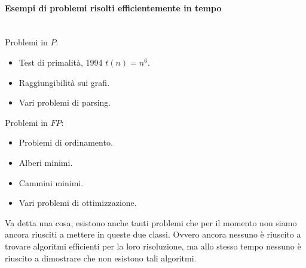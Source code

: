 \documentclass{article}
\begin{document}
\paragraph{Esempi di problemi risolti efficientemente in tempo}\mbox{}\\
Problemi in $P$:
\begin{itemize}
    \item Test di primalità, 1994 $t(n)=n^6$.
    \item Raggiungibilità sui grafi.
    \item Vari problemi di parsing.
\end{itemize}
Problemi in $FP$:
\begin{itemize}
    \item Problemi di ordinamento.
    \item Alberi minimi.
    \item Cammini minimi.
    \item Vari problemi di ottimizzazione.
\end{itemize}
Va detta una cosa, esistono anche tanti problemi che per il momento non siamo ancora
riusciti a mettere in queste due classi. Ovvero ancora nessuno è riuscito a trovare algoritmi
efficienti per la loro risoluzione, ma allo stesso tempo nessuno è riuscito a dimostrare
che non esistono tali algoritmi.
\end{document}
